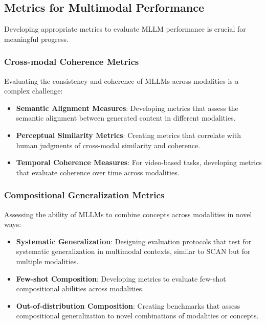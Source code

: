 \subsection{Metrics for Multimodal Performance}
Developing appropriate metrics to evaluate MLLM performance is crucial for meaningful progress.

\subsubsection{Cross-modal Coherence Metrics}
Evaluating the consistency and coherence of MLLMs across modalities is a complex challenge:

\begin{itemize}
    \item \textbf{Semantic Alignment Measures}: Developing metrics that assess the semantic alignment between generated content in different modalities.
    
    \item \textbf{Perceptual Similarity Metrics}: Creating metrics that correlate with human judgments of cross-modal similarity and coherence.
    
    \item \textbf{Temporal Coherence Measures}: For video-based tasks, developing metrics that evaluate coherence over time across modalities.
\end{itemize}

\subsubsection{Compositional Generalization Metrics}
Assessing the ability of MLLMs to combine concepts across modalities in novel ways:

\begin{itemize}
    \item \textbf{Systematic Generalization}: Designing evaluation protocols that test for systematic generalization in multimodal contexts, similar to SCAN \citep{lake2018generalization} but for multiple modalities.
    
    \item \textbf{Few-shot Composition}: Developing metrics to evaluate few-shot compositional abilities across modalities.
    
    \item \textbf{Out-of-distribution Composition}: Creating benchmarks that assess compositional generalization to novel combinations of modalities or concepts.
\end{itemize}

